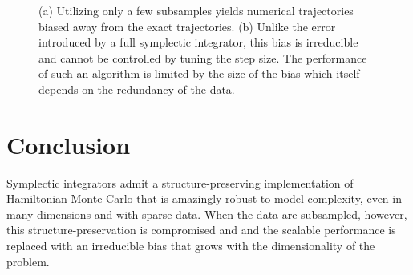 \documentclass{article}
\begin{document}
\begin{figure}
\centering
{}
\caption{(a) Utilizing only a few subsamples yields numerical trajectories
biased away from the exact trajectories.  (b) Unlike the error introduced by
a full symplectic integrator, this bias is irreducible and cannot be controlled
by tuning the step size.  The performance of such an algorithm is limited by 
the size of the bias which itself depends on the redundancy of the data.}
\label{fig:subsample_trajectory}
\end{figure}

\section{Conclusion}

Symplectic integrators admit a structure-preserving implementation of
Hamiltonian Monte Carlo that is amazingly robust to model complexity,
even in many dimensions and with sparse data.  When the data are
subsampled, however, this structure-preservation is compromised and
and the scalable performance is replaced with an irreducible bias that
grows with the dimensionality of the problem.  
\end{document}
